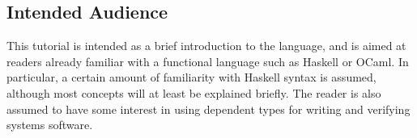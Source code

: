 \subsection{Intended Audience}

This tutorial is intended as a brief introduction to the language, and is aimed
at readers already familiar with a functional language such as Haskell or
OCaml. In particular, a certain amount of familiarity with Haskell syntax is
assumed, although most concepts will at least be explained briefly.  The reader
is also assumed to have some interest in using dependent types for writing and
verifying systems software.
